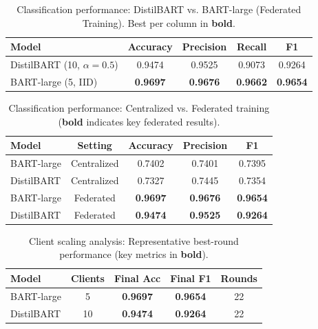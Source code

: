\documentclass[conference]{IEEEtran}
\begin{document}
\begin{table}[H]
    \centering
    \caption{Classification performance: DistilBART vs. BART-large (Federated Training). Best per column in \textbf{bold}.}
    \label{tab:cls_modelsize}
    {\small
    \begin{tabular}{lcccc}
        \hline
        Model & Accuracy & Precision & Recall & F1 \\
        \hline
        DistilBART (10, $\alpha{=}0.5$) & 0.9474 & 0.9525 & 0.9073 & 0.9264 \\
        BART-large (5, IID) & \textbf{0.9697} & \textbf{0.9676} & \textbf{0.9662} & \textbf{0.9654} \\
        \hline
    \end{tabular}}
\end{table}

\begin{table}[H]
    \centering
    \caption{Classification performance: Centralized vs. Federated training (\textbf{bold} indicates key federated results).}
    \label{tab:cls_cent_vs_fed}
    \begin{tabular}{lcccc}
        \hline
        Model & Setting & Accuracy & Precision & F1 \\
        \hline
        BART-large & Centralized & 0.7402 & 0.7401 & 0.7395 \\
        DistilBART & Centralized & 0.7327 & 0.7445 & 0.7354 \\
        BART-large & Federated & \textbf{0.9697} & \textbf{0.9676} & \textbf{0.9654} \\
        DistilBART & Federated & \textbf{0.9474} & \textbf{0.9525} & \textbf{0.9264} \\
        \hline
    \end{tabular}
\end{table}

\begin{table}[H]
    \centering
    \caption{Client scaling analysis: Representative best-round performance (key metrics in \textbf{bold}).}
    \label{tab:client_scaling}
    \begin{tabular}{lcccc}
        \hline
        Model & Clients & Final Acc & Final F1 & Rounds \\
        \hline
        BART-large & 5 & \textbf{0.9697} & \textbf{0.9654} & 22 \\
        DistilBART & 10 & \textbf{0.9474} & \textbf{0.9264} & 22 \\
        \hline
    \end{tabular}
\end{table}
\end{document}
